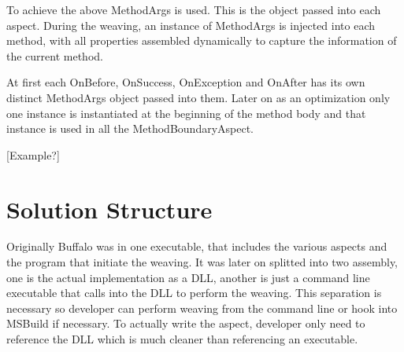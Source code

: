 To achieve the above MethodArgs is used. This is the object passed into each aspect. During the weaving, an instance of MethodArgs is injected into each method, with all properties assembled dynamically to capture the information of the current method.

At first each OnBefore, OnSuccess, OnException and OnAfter has its own distinct MethodArgs object passed into them. Later on as an optimization only one instance is instantiated at the beginning of the method body and that instance is used in all the MethodBoundaryAspect.

[Example?]

\section{Solution Structure}

Originally Buffalo was in one executable, that includes the various aspects and the program that initiate the weaving. It was later on splitted into two assembly, one is the actual implementation as a DLL, another is just a command line executable that calls into the DLL to perform the weaving. This separation is necessary so developer can perform weaving from the command line or hook into MSBuild if necessary. To actually write the aspect, developer only need to reference the DLL which is much cleaner than referencing an executable.
%



%
